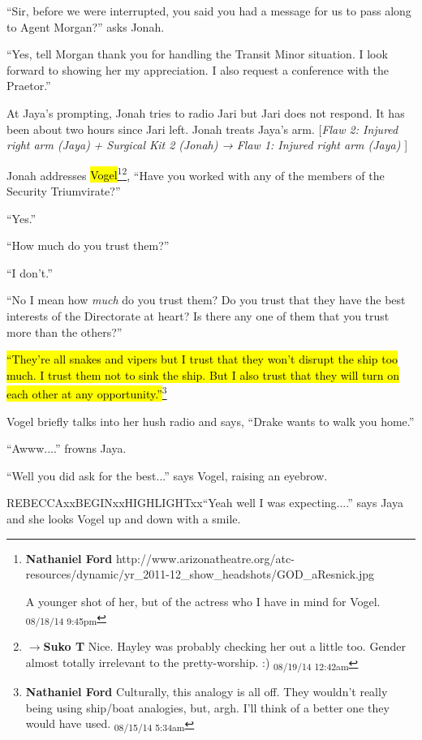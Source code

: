 ``Sir, before we were interrupted, you said you had a message for us to pass along to Agent Morgan?'' asks Jonah.

``Yes, tell Morgan thank you for handling the Transit Minor situation.  I look forward to showing her my appreciation.  I also request a conference with the Praetor.''



At Jaya's prompting, Jonah tries to radio Jari but Jari does not respond.  It has been about two hours since Jari left.  Jonah treats Jaya's arm. {[}\textit{Flaw 2: Injured right arm (Jaya)}\textit{ + Surgical Kit 2 (Jonah) → }\textit{ {\color[RGB]{255,0,0}Flaw 1: Injured right arm (Jaya)} }{]}



Jonah addresses \hl{Vogel}\footnote{\textbf{Nathaniel Ford }http://www.arizonatheatre.org/atc-resources/dynamic/yr\_2011-12\_show\_headshots/GOD\_aResnick.jpg

A younger shot of her, but of the actress who I have in mind for Vogel. \textsubscript{08/18/14 9:45pm}}\footnote{$\rightarrow$\textbf{Suko T }Nice.  Hayley was probably checking her out a little too.  Gender almost totally irrelevant to the pretty-worship. :) \textsubscript{08/19/14 12:42am}}, ``Have you worked with any of the members of the Security Triumvirate?''

``Yes.''

``How much do you trust them?''

``I don't.''

``No I mean how \textit{much} do you trust them?  Do you trust that they have the best interests of the Directorate at heart?  Is there any one of them that you trust more than the others?''

\hl{``They're all snakes and vipers but I trust that they won't disrupt the ship too much.  I trust them not to sink the ship.  But I also trust that they will turn on each other at any opportunity.''}\footnote{\textbf{Nathaniel Ford }Culturally, this analogy is all off. They wouldn't really being using ship/boat analogies, but, argh. I'll think of a better one they would have used. \textsubscript{08/15/14 5:34am}}

Vogel briefly talks into her hush radio and says, ``Drake wants to walk you home.''

``Awww....'' frowns Jaya.

``Well you did ask for the best...'' says Vogel, raising an eyebrow.

REBECCAxxBEGINxxHIGHLIGHTxx``Yeah well I was expecting....'' says Jaya and she looks Vogel up and down with a smile.

